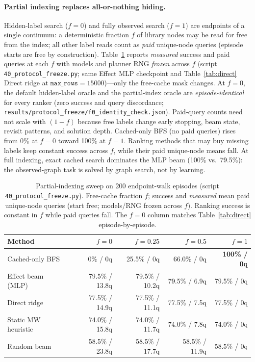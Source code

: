 \paragraph{Partial indexing replaces all-or-nothing hiding.}
Hidden-label search ($f{=}0$) and fully observed search ($f{=}1$) are endpoints of a single continuum: a deterministic fraction $f$ of library nodes may be read for free from the index; all other label reads count as \emph{paid} unique-node queries (episode starts are free by construction). Table~\ref{tab:partial} reports \emph{measured} success and paid queries at each $f$ with models and planner RNG \emph{frozen} across $f$ (script \texttt{40\_protocol\_freeze.py}; same Effect MLP checkpoint and Table~\ref{tab:direct} Direct ridge at $\texttt{max\_rows}{=}15000$)---only the free-cache mask changes. At $f{=}0$, the default hidden-label oracle and the partial-index oracle are \emph{episode-identical} for every ranker (zero success and query discordance; \texttt{results/protocol\_freeze/f0\_identity\_check.json}). Paid-query counts need not scale with $(1{-}f)$ because free labels change early stopping, beam state, revisit patterns, and solution depth. Cached-only BFS (no paid queries) rises from 0\% at $f{=}0$ toward 100\% at $f{=}1$. Ranking methods that may buy missing labels keep constant success across $f$, while their paid unique-node means fall. At full indexing, exact cached search dominates the MLP beam (100\% vs.\ 79.5\%): the observed-graph task is solved by graph search, not by learning.

\begin{table}[t]
\caption{Partial-indexing sweep on 200 endpoint-walk episodes (script \texttt{40\_protocol\_freeze.py}). Free-cache fraction $f$; success and \emph{measured} mean paid unique-node queries (start free; models/RNG frozen across $f$). Ranking success is constant in $f$ while paid queries fall. The $f{=}0$ column matches Table~\ref{tab:direct} episode-by-episode.}
\label{tab:partial}
\centering
\small
\begin{tabular}{lrrrr}
\toprule
Method & $f{=}0$ & $f{=}0.25$ & $f{=}0.5$ & $f{=}1$ \\
\midrule
Cached-only BFS & 0\% / 0q & 25.5\% / 0q & 66.0\% / 0q & \textbf{100\% / 0q} \\
Effect beam (MLP) & 79.5\% / 13.8q & 79.5\% / 10.2q & 79.5\% / 6.9q & 79.5\% / 0q \\
Direct ridge & 77.5\% / 14.9q & 77.5\% / 11.1q & 77.5\% / 7.5q & 77.5\% / 0q \\
Static MW heuristic & 74.0\% / 15.8q & 74.0\% / 11.7q & 74.0\% / 7.8q & 74.0\% / 0q \\
Random beam & 58.5\% / 23.8q & 58.5\% / 17.7q & 58.5\% / 11.9q & 58.5\% / 0q \\
\bottomrule
\end{tabular}
\end{table}


